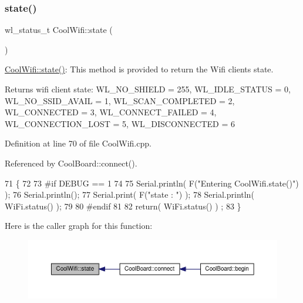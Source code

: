 \subsubsection{\texorpdfstring{state()}{state()}}
{\footnotesize\ttfamily wl\+\_\+status\+\_\+t Cool\+Wifi\+::state (\begin{DoxyParamCaption}{ }\end{DoxyParamCaption})}

\hyperlink{classCoolWifi_a1c7b4d82a4098d346e7593dce92039fa}{Cool\+Wifi\+::state()}\+: This method is provided to return the Wifi client\textquotesingle{}s state. \begin{DoxyReturn}{Returns}
wifi client state\+: W\+L\+\_\+\+N\+O\+\_\+\+S\+H\+I\+E\+LD = 255, W\+L\+\_\+\+I\+D\+L\+E\+\_\+\+S\+T\+A\+T\+US = 0, W\+L\+\_\+\+N\+O\+\_\+\+S\+S\+I\+D\+\_\+\+A\+V\+A\+IL = 1, W\+L\+\_\+\+S\+C\+A\+N\+\_\+\+C\+O\+M\+P\+L\+E\+T\+ED = 2, W\+L\+\_\+\+C\+O\+N\+N\+E\+C\+T\+ED = 3, W\+L\+\_\+\+C\+O\+N\+N\+E\+C\+T\+\_\+\+F\+A\+I\+L\+ED = 4, W\+L\+\_\+\+C\+O\+N\+N\+E\+C\+T\+I\+O\+N\+\_\+\+L\+O\+ST = 5, W\+L\+\_\+\+D\+I\+S\+C\+O\+N\+N\+E\+C\+T\+ED = 6 
\end{DoxyReturn}


Definition at line 70 of file Cool\+Wifi.\+cpp.



Referenced by Cool\+Board\+::connect().


\begin{DoxyCode}
71 \{
72 
73 \textcolor{preprocessor}{#if DEBUG == 1 }
74 
75     Serial.println( F(\textcolor{stringliteral}{"Entering CoolWifi.state()"}) );
76     Serial.println();   
77     Serial.print( F(\textcolor{stringliteral}{"state : "}) );
78     Serial.println( WiFi.status() );
79 
80 \textcolor{preprocessor}{#endif}
81     
82     \textcolor{keywordflow}{return}( WiFi.status() ) ;
83 \}
\end{DoxyCode}
Here is the caller graph for this function\+:\nopagebreak
\begin{figure}[H]
\begin{center}
\leavevmode
\includegraphics[width=350pt]{classCoolWifi_a1c7b4d82a4098d346e7593dce92039fa_icgraph}
\end{center}
\end{figure}


